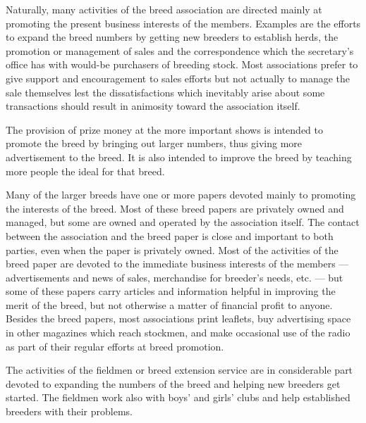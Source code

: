 Naturally, many activities of the breed association are directed mainly at promoting the present business interests of the 
members. Examples are the efforts to expand the breed numbers by getting new breeders to establish herds, the promotion or 
management of sales and the correspondence which the secretary's office has with would-be purchasers of breeding stock. 
Most associations prefer to give support and encouragement to sales efforts but not actually to manage the sale themselves
lest the dissatisfactions which inevitably arise about some transactions should result in animosity toward the association 
itself.

The provision of prize money at the more important shows is intended to promote the breed by bringing out larger numbers, 
thus giving more advertisement to the breed. It is also intended to improve the breed by teaching more people the ideal for 
that breed.

Many of the larger breeds have one or more papers devoted mainly to promoting the interests of the breed. Most of these 
breed papers are privately owned and managed, but some are owned and operated by the association itself. The contact 
between the association and the breed paper is close and important to both parties, even when the paper is privately owned. 
Most of the activities of the breed paper are devoted to the immediate business interests of the members --- advertisements 
and news of sales, merchandise for breeder's needs, etc. --- but some of these papers carry articles and information helpful 
in improving the merit of the breed, but not otherwise a matter of financial profit to anyone. Besides the breed papers, 
most associations print leaflets, buy advertising space in other magazines which reach stockmen, and make occasional use of 
the radio as part of their regular efforts at breed promotion.

The activities of the fieldmen or breed extension service are in considerable part devoted to expanding the numbers of the 
breed and helping new breeders get started. The fieldmen work also with boys' and girls' clubs and help established 
breeders with their problems. 

